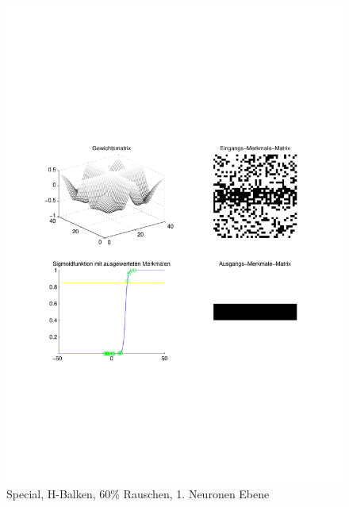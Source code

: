 \begin{figure}[hbt]
	\begin{minipage}{0.8 \textwidth}
		\includegraphics[width=\textwidth]{./Bilder/Auswertung/Endergebnis/TypeSpecial_Rauschen60_H_Line_Layer1}
		\caption{Special, H-Balken, 60\% Rauschen, 1. Neuronen Ebene}
		\label{Special_H_60_1}
	\end{minipage}
	\vfill
	\begin{minipage}{0.8 \textwidth}

\end{minipage}
\end{figure}
